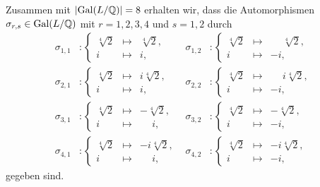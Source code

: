 \begin{solution}
\begin{enumerate}
      Zusammen mit $|{\operatorname{Gal}(L / \mathbb{Q})}| = 8$ erhalten wir, dass die Automorphismen $\sigma_{r,s} \in \operatorname{Gal}(L / \mathbb{Q})$ mit $r = 1, 2, 3, 4$ und $s = 1, 2$ durch
      \begin{align*}
        \sigma_{1,1}
        &\colon
        \left\{
          \begin{array}{rcl}
            \sqrt[4]{2} & \mapsto & \sqrt[4]{2},  \\
            i           & \mapsto & i,
          \end{array}
        \right.
        &
        \sigma_{1,2}
        &\colon
        \left\{
          \begin{array}{rcl}
            \sqrt[4]{2} & \mapsto & \phantom{-}\sqrt[4]{2},  \\
            i           & \mapsto &           -i,
          \end{array}
        \right.
        \\
        \sigma_{2,1}
        &\colon
        \left\{
          \begin{array}{rcl}
            \sqrt[4]{2} & \mapsto & i\sqrt[4]{2},  \\
            i           & \mapsto & i,
          \end{array}
        \right.
        &
        \sigma_{2,2}
        &\colon
        \left\{
          \begin{array}{rcl}
            \sqrt[4]{2} & \mapsto & \phantom{-}i\sqrt[4]{2},  \\
            i           & \mapsto &           -i,
          \end{array}
        \right.
        \\
        \sigma_{3,1}
        &\colon
        \left\{
          \begin{array}{rcl}
            \sqrt[4]{2} & \mapsto &           -\sqrt[4]{2},  \\
            i           & \mapsto & \phantom{-}i,
          \end{array}
        \right.
        &
        \sigma_{3,2}
        &\colon
        \left\{
          \begin{array}{rcl}
            \sqrt[4]{2} & \mapsto & -\sqrt[4]{2},  \\
            i           & \mapsto & -i,
          \end{array}
        \right.
        \\
        \sigma_{4,1}
        &\colon
        \left\{
          \begin{array}{rcl}
            \sqrt[4]{2} & \mapsto &           -i\sqrt[4]{2},  \\
            i           & \mapsto & \phantom{-}i,
          \end{array}
        \right.
        &
        \sigma_{4,2}
        &\colon
        \left\{
          \begin{array}{rcl}
            \sqrt[4]{2} & \mapsto & -i\sqrt[4]{2},  \\
            i           & \mapsto & -i,
          \end{array}
        \right.
      \end{align*}
      gegeben sind.
      

\end{enumerate}
\end{solution}
